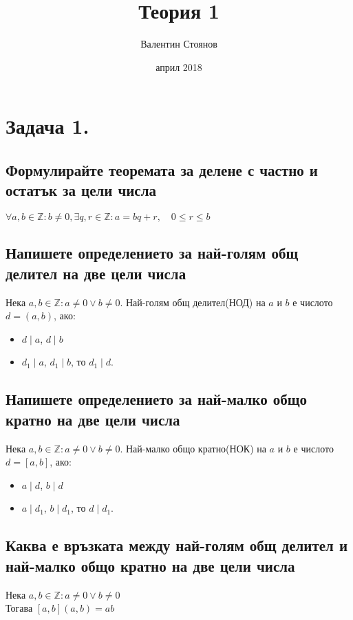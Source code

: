 \documentclass[10pt]{article}
\newcommand*{\Z}{\mathbb{Z}}
\begin{document}
\title{Теория 1}
\author{Валентин Стоянов}
\date{април 2018}
\maketitle

\section*{Задача 1.}

\subsection*{Формулирайте теоремата за делене с частно и остатък за цели числа}
$\forall a, b \in \Z: b \neq 0, \exists q, r \in \Z: a = bq + r, \quad 0 \leq r \leq b$

\subsection*{Напишете определението за най-голям общ делител на две цели числа}
Нека $a, b \in \Z: a \neq 0 \vee b \neq 0$. Най-голям общ делител(НОД) на $a$ и $b$ е числото $d = (a, b)$, ако:
\begin{itemize}
	\item $d \mid a$, $d \mid b$
	\item $d_1 \mid a$, $d_1 \mid b$, то $d_1 \mid d$.
\end{itemize}

\subsection*{Напишете определението за най-малко общо кратно на две цели числа}
Нека $a, b \in \Z: a \neq 0 \vee b \neq 0$. Най-малко общо кратно(НОК) на $a$ и $b$ е числото $d = [a, b]$, ако:
\begin{itemize}
	\item $a \mid d$, $b \mid d$
	\item $a \mid d_1$, $b \mid d_1$, то $d \mid d_1$.
\end{itemize}

\subsection*{Каква е връзката между най-голям общ делител и най-малко общо кратно на две цели числа}
Нека $a, b \in \Z: a \neq 0 \vee b \neq 0$\\
Тогава $[a, b](a, b) = ab$
\end{document}
